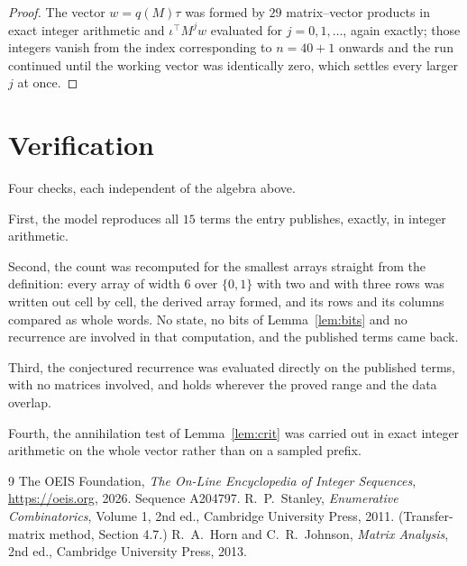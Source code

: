 \documentclass[11pt,a4paper]{article}
\theoremstyle{plain}
\theoremstyle{definition}
\begin{document}
\begin{proof}
The vector $w=q(M)\tau$ was formed by $29$ matrix--vector products in exact integer
arithmetic and $\iota^{\!\top}M^{j}w$ evaluated for $j=0,1,\dots$, again exactly; those
integers vanish from the index corresponding to $n=40+1$ onwards and the run continued
until the working vector was identically zero, which settles every larger $j$ at once.
\end{proof}

\section{Verification}

Four checks, each independent of the algebra above.

First, the model reproduces all $15$ terms the entry publishes, exactly, in integer
arithmetic.

Second, the count was recomputed for the smallest arrays straight from the definition: every
array of width $6$ over $\{0,1\}$ with two and with three rows was written out cell by cell,
the derived array formed, and its rows and its columns compared as whole words. No state, no
bits of Lemma~\ref{lem:bits} and no recurrence are involved in that computation, and the
published terms came back.

Third, the conjectured recurrence was evaluated directly on the published terms, with no
matrices involved, and holds wherever the proved range and the data overlap.

Fourth, the annihilation test of Lemma~\ref{lem:crit} was carried out in exact integer
arithmetic on the whole vector rather than on a sampled prefix.

\begin{thebibliography}{9}
 The OEIS Foundation, \emph{The On-Line Encyclopedia of Integer
Sequences}, \url{https://oeis.org}, 2026. Sequence A204797.
 R.~P.~Stanley, \emph{Enumerative Combinatorics}, Volume 1, 2nd ed.,
Cambridge University Press, 2011. (Transfer-matrix method, Section 4.7.)
 R.~A.~Horn and C.~R.~Johnson, \emph{Matrix Analysis}, 2nd ed., Cambridge
University Press, 2013.
\end{thebibliography}
\end{document}
